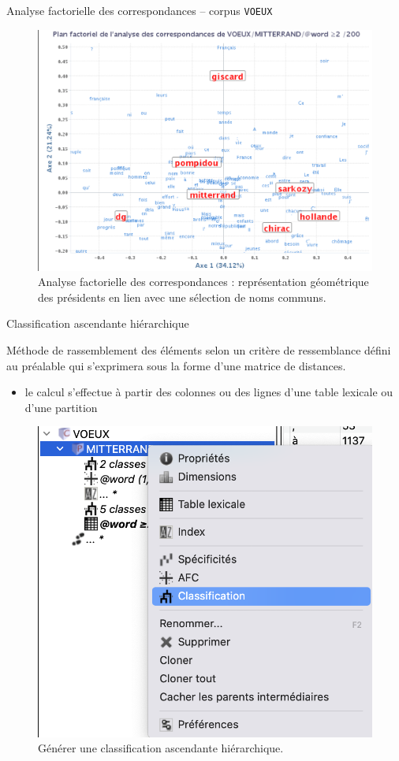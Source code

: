 \documentclass[xetex,xcolor={table,usenames,dvipsnames}]{beamer}
\begin{document}
\begin{frame}{Analyse factorielle des correspondances -- corpus \texttt{VOEUX}}
		\begin{figure}[h] %
		\centering
		\includegraphics[width=.8\linewidth]{img/afc.png}
		\caption{Analyse factorielle des correspondances : représentation géométrique des présidents en lien avec une sélection de noms communs.}
		\label{fig:ling_out_TAL}
	\end{figure}
\end{frame}

\begin{frame}{Classification ascendante hiérarchique \citep{benzecri1979}}
		\begin{block}{\vspace{-6mm}}
		\justifying 
Méthode de rassemblement des éléments selon un critère de ressemblance défini au préalable qui s’exprimera sous la forme d’une matrice de distances.
		\end{block}
		\begin{itemize}
	\item le calcul s'effectue à partir des colonnes ou des lignes d'une table lexicale ou d’une partition	
\end{itemize}
			\begin{figure}[h] %
		\centering
		\includegraphics[width=.3\linewidth]{img/classif.png}
		\caption{Générer une classification ascendante hiérarchique.}
		\label{fig:ling_out_TAL}
	\end{figure}
\end{frame}
\end{document}
